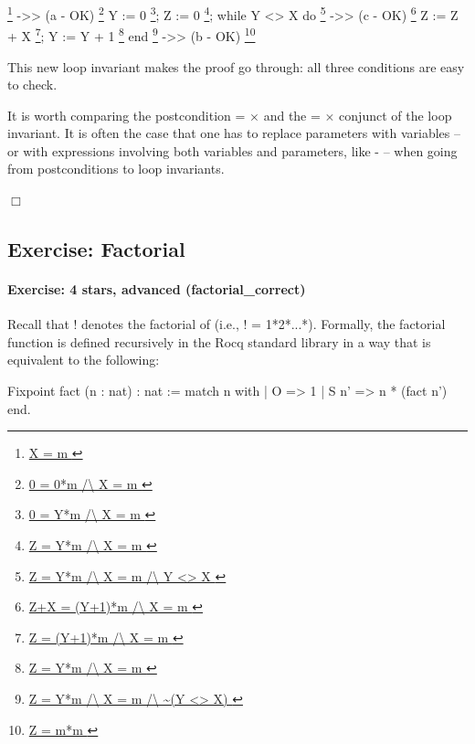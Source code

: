 \documentclass[12pt]{report}
\begin{document}
    \footnote{\url{ X = m }} ->>                                        (a - OK)
    \footnote{\url{ 0 = 0*m /\ X = m }}
      Y := 0
                    \footnote{\url{ 0 = Y*m /\ X = m }};
      Z := 0
                    \footnote{\url{ Z = Y*m /\ X = m }};
      while Y <> X do
                    \footnote{\url{ Z = Y*m /\ X = m /\ Y <> X }} ->>   (c - OK)
                    \footnote{\url{ Z+X = (Y+1)*m /\ X = m }}
        Z := Z + X
                    \footnote{\url{ Z = (Y+1)*m /\ X = m }};
        Y := Y + 1
                    \footnote{\url{ Z = Y*m /\ X = m }}
      end
    \footnote{\url{ Z = Y*m /\ X = m /\ ~(Y <> X) }} ->>                (b - OK)
    \footnote{\url{ Z = m*m }}


    This new loop invariant makes the proof go through: all three
    conditions are easy to check.


    It is worth comparing the postcondition  = \ensuremath{\times} and the
     = \ensuremath{\times} conjunct of the loop invariant. It is often the case
    that one has to replace parameters with variables -- or with
    expressions involving both variables and parameters, like
     -  -- when going from postconditions to loop invariants. 

 \ensuremath{\Box} 
\begin{coqdoccode}
\coqdocemptyline
\end{coqdoccode}
\subsection{Exercise: Factorial}



\paragraph{Exercise: 4 stars, advanced (factorial\_correct)}




    Recall that ! denotes the factorial of  (i.e., ! =
    1*2*...*).  Formally, the factorial function is defined
    recursively in the Rocq standard library in a way that is
    equivalent to the following:


    Fixpoint fact (n : nat) : nat :=
      match n with
      | O => 1
      | S n' => n * (fact n')
      end.
\end{document}
